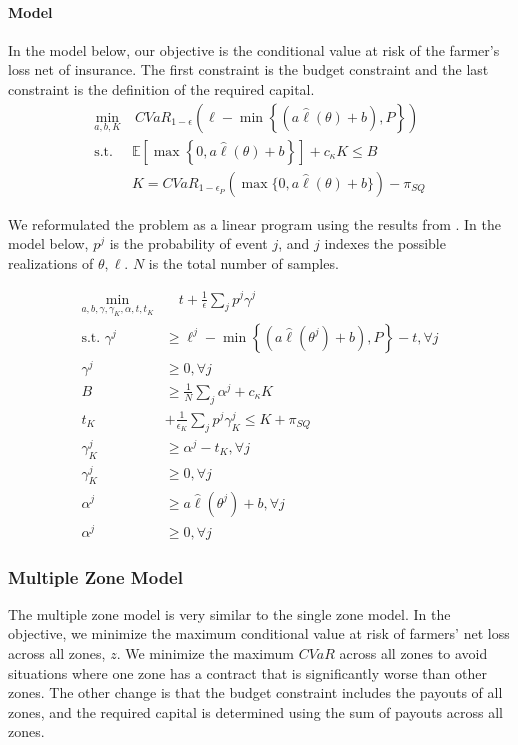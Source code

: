\documentclass[11pt]{article}
\begin{document}
  \paragraph*{Model}
  In the model below, our objective is the conditional value at risk of the farmer's loss net of insurance. The first constraint is the budget constraint and the last constraint is the definition of the required capital. 
  \begin{align}
    \min_{a,b,K} &\ CVaR_{1-\epsilon}\left(\ell  - \min \left \{(a \hat{\ell}(\theta) + b), P \right \} \right)\\
    \text{s.t.   } & \mathbb{E}[\max \left \{0,a \hat{\ell}(\theta) +b \right \}] +c_{\kappa} K \leq B\\
    & K = CVaR_{1-\epsilon_P} \left( \max \{0,a \hat{\ell}(\theta) +b \} \right) - \pi_{SQ}
\end{align}

  We reformulated the problem as a linear program  using the results from \cite{rockafellar2000optimization}. In the model below, $p^j$ is the probability of event $j$, and $j$ indexes the possible realizations of $\theta, \ell$. $N$ is the total number of samples. 
  
  \begin{align}
      \min_{a,b,\gamma,\gamma_K,\alpha,t,t_K} &\quad t + \frac{1}{\epsilon}\sum_j p^j \gamma^j\\
      \text{s.t.   } \gamma^j &\geq \ell^j - \min\left\{(a\hat{\ell}(\theta^j) + b), P\right\} - t, \forall j\\
      \gamma^j &\geq 0, \forall j \\
        B &\geq \frac{1}{N}\sum_j \alpha^j + c_{\kappa} K\\
        t_K &+ \frac{1}{\epsilon_K} \sum_j p^j \gamma_K^j \leq K+\pi_{SQ}\\
        \gamma_K^j &\geq \alpha^j -t_K, \forall j \\
        \gamma_K^j &\geq 0, \forall j\\
        \alpha^j &\geq a \hat{\ell}(\theta^j) + b, \forall j\\
        \alpha^j &\geq 0, \forall j
  \end{align}
    
  \subsubsection{Multiple Zone Model}
  The multiple zone model is very similar to the single zone model. In the objective, we minimize the maximum conditional value at risk of  farmers' net loss across all zones, $z$. We minimize the maximum $CVaR$ across all zones to avoid situations where one zone has a contract that is significantly worse than other zones. The other change is that the budget constraint includes the payouts of all zones, and the required capital is determined using the sum of payouts across all zones. 
\end{document}
